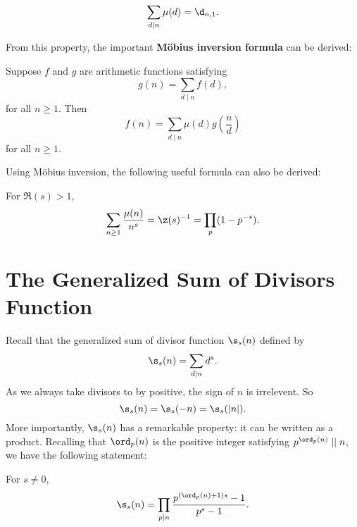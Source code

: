     \begin{proposition}\label{prop:Mobius_dirac_delta}
      \[
        \sum_{d \mid n}\mu(d) = \d_{n,1}.
      \]
    \end{proposition}

    From this property, the important \textbf{M\"obius inversion formula} can be derived:

    \begin{theorem}
      Suppose $f$ and $g$ are arithmetic functions satisfying
      \[
        g(n) = \sum_{d \mid n}f(d),
      \]
      for all $n \ge 1$. Then
      \[
        f(n) = \sum_{d \mid n}\mu(d)g\left(\frac{n}{d}\right)
      \]
      for all $n \ge 1$.
    \end{theorem}

    Using M\"obius inversion, the following useful formula can also be derived:

    \begin{proposition}\label{prop:Dirichlet_Mobius_is_zeta_inverse}
      For $\Re(s) > 1$,
      \[
        \sum_{n \ge 1}\frac{\mu(n)}{n^{s}} = \z(s)^{-1} = \prod_{p}(1-p^{-s}).
      \]
    \end{proposition}
  \section{The Generalized Sum of Divisors Function}
    Recall that the generalized sum of divisor function $\s_{s}(n)$ defined by
    \[
      \s_{s}(n) = \sum_{d \mid n}d^{s}.
    \]
    As we always take divisors to by positive, the sign of $n$ is irrelevent. So
    \[
      \s_{s}(n)  = \s_{s}(-n) = \s_{s}(|n|).
    \]
    More importantly, $\s_{s}(n)$ has a remarkable property: it can be written as a product. Recalling that $\ord_{p}(n)$ is the positive integer satisfying $p^{\ord_{p}(n)} \mid\mid n$, we have the following statement:

    \begin{proposition}\label{prop:generalized_sum_of_divisors_as_product}
      For $s \neq 0$,
      \[
        \s_{s}(n) = \prod_{p \mid n}\frac{p^{(\ord_{p}(n)+1)s}-1}{p^{s}-1}.
      \]
    \end{proposition}

